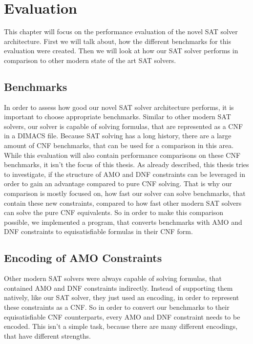 
\chapter{Evaluation}
\label{ch:Evaluation}

This chapter will focus on the performance evaluation of the novel SAT solver architecture. First we will talk about, how the different benchmarks for this evaluation were created. Then we will look at how our SAT solver performs in comparison to other modern state of the art SAT solvers.

\section{Benchmarks}

In order to assess how good our novel SAT solver architecture performs, it is important to choose appropriate benchmarks. Similar to other modern SAT solvers, our solver is capable of solving formulas, that are represented as a CNF in a DIMACS file. Because SAT solving has a long history, there are a large amount of CNF benchmarks, that can be used for a comparison in this area. While this evaluation will also contain performance comparisons on these CNF benchmarks, it isn't the focus of this thesis. As already described, this thesis tries to investigate, if the structure of AMO and DNF constraints can be leveraged in order to gain an advantage compared to pure CNF solving. That is why our comparison is mostly focused on, how fast our solver can solve benchmarks, that contain these new constraints, compared to how fast other modern SAT solvers can solve the pure CNF equivalents. So in order to make this comparison possible, we implemented a program, that converts benchmarks with AMO and DNF constraints to equisatisfiable formulas in their CNF form.

\section{Encoding of AMO Constraints}

Other modern SAT solvers were always capable of solving formulas, that contained AMO and DNF constraints indirectly. Instead of supporting them natively, like our SAT solver, they just used an encoding, in order to represent these constraints as a CNF. So in order to convert our benchmarks to their equisatisfiable CNF counterparts, every AMO and DNF constraint needs to be encoded. This isn't a simple task, because there are many different encodings, that have different strengths.

